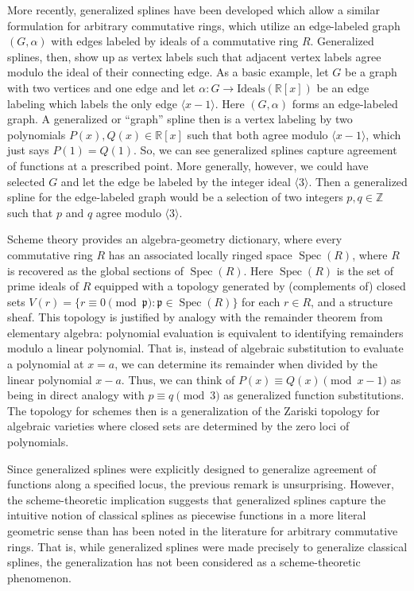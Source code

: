 \documentclass{article}
\newcommand{\Z}{\mathbb Z}
\newcommand{\R}{\mathbb R}
\DeclareMathOperator{\Spec}{Spec}
\begin{document}
More recently, generalized splines have been developed which allow a similar formulation for arbitrary commutative rings, which utilize an edge-labeled graph $(G, \alpha)$ with edges labeled by ideals of a commutative ring $R$. Generalized splines, then, show up as vertex labels such that adjacent vertex labels agree modulo the ideal of their connecting edge. As a basic example, let $G$ be a graph with two vertices and one edge and let $\alpha : G \rightarrow \text{Ideals}(\R[x])$ be an edge labeling which labels the only edge $\langle x-1 \rangle$. Here $(G, \alpha)$ forms an edge-labeled graph. A generalized or ``graph'' spline then is a vertex labeling by two polynomials $P(x), Q(x) \in \R[x]$ such that both agree modulo $\langle x - 1 \rangle$, which just says $P(1) = Q(1)$. So, we can see generalized splines capture agreement of functions at a prescribed point. More generally, however, we could have selected $G$ and let the edge be labeled by the integer ideal $\langle 3 \rangle$. Then a generalized spline for the edge-labeled graph would be a selection of two integers $p,q \in \Z$ such that $p$ and $q$ agree modulo $\langle 3 \rangle$.

Scheme theory provides an algebra-geometry dictionary, where every commutative ring $R$ has an associated locally ringed space $\Spec(R)$, where $R$ is recovered as the global sections of $\Spec(R)$. Here $\Spec(R)$ is the set of prime ideals of $R$ equipped with a topology generated by (complements of) closed sets $V(r) = \{r \equiv 0 \pmod{\mathfrak p} : \mathfrak p \in \Spec(R)\}$ for each $r \in R$, and a structure sheaf. This topology is justified by analogy with the remainder theorem from elementary algebra: polynomial evaluation is equivalent to identifying remainders modulo a linear polynomial. That is, instead of algebraic substitution to evaluate a polynomial at $x=a$, we can determine its remainder when divided by the linear polynomial $x-a$. Thus, we can think of $P(x) \equiv Q(x) \pmod{ x - 1}$ as being in direct analogy with $p \equiv q \pmod{3}$ as generalized function substitutions. The topology for schemes then is a generalization of the Zariski topology for algebraic varieties where closed sets are determined by the zero loci of polynomials.

Since generalized splines were explicitly designed to generalize agreement of functions along a specified locus, the previous remark is unsurprising. However, the scheme-theoretic implication suggests that generalized splines capture the intuitive notion of classical splines as piecewise functions in a more literal geometric sense than has been noted in the literature for arbitrary commutative rings. That is, while generalized splines were made precisely to generalize classical splines, the generalization has not been considered as a scheme-theoretic phenomenon.
\end{document}
